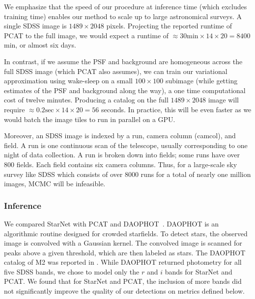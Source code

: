 We emphasize that the speed of our procedure at inference time (which excludes training time) enables our method to scale up to large astronomical surveys. A single SDSS image is $1489 \times 2048$ pixels. Projecting the reported runtime of PCAT to the full image, 
we would expect a runtime of 
$\approx 30\text{min} \times 14 \times 20 = 8400$min, or almost six days. 

In contrast, if we assume the PSF and background are homogeneous 
across the full SDSS image (which PCAT also assumes), we can 
train our variational approximation using wake-sleep 
on a small $100 \times 100$ subimage
(while getting estimates of the PSF and background along the way),
a one time computational cost of twelve minutes. 
Producing a catalog on the full $1489 \times 2048$ image will require 
$\approx 0.2\text{sec} \times 14 \times 20 = 56$ seconds. In practice, 
this will be even faster as we would batch the image tiles to run in parallel on a GPU. 

Moreover, an SDSS image is indexed by a run, camera column (camcol), and field.
A run is one continuous scan of the telescope, usually corresponding to one night of data collection. 
A run is broken down into fields; some runs have over 800 fields. 
Each field contains six camera columns. 
Thus, for a large-scale sky survey like SDSS which 
consists of over 8000 runs for a total of nearly one million images, MCMC will be infeasible. 


\subsubsection{Inference}
\label{sec:m2_results}
We compared StarNet with PCAT and DAOPHOT~\cite{stetson2987daophot}. DAOPHOT is an algorithmic routine designed for crowded starfields. 
To detect stars, the observed image is convolved with a Gaussian kernel. 
The convolved image is scanned for peaks above a given threshold, which are then labeled as stars. The DAOPHOT catalog of M2 was reported in 
\cite{An_2008_m2}. While DAOPHOT returned photometry for all five SDSS bands, 
we chose to model only the $r$ and $i$ bands for StarNet and PCAT. We found that for StarNet and PCAT, the inclusion of more bands did not significantly improve
the quality of our detections on metrics defined below. 

